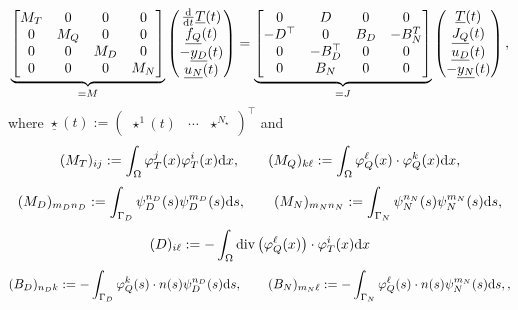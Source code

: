 \documentclass[letterpaper,10pt,english]{sphinxmanual}
\begin{document}
\begin{equation*}
\begin{split}\underbrace{\begin{bmatrix}
M_T & 0 & 0 & 0 \\
0 & M_Q & 0 & 0 \\
0 & 0 & M_D & 0 \\
0 & 0 & 0 & M_N
\end{bmatrix}}_{= M}
\begin{pmatrix}
\frac{\rm d}{{\rm d}t} \underline{T}(t) \\
\underline{f_Q}(t) \\
-\underline{y_D}(t) \\
\underline{u_N}(t)
\end{pmatrix}
=
\underbrace{\begin{bmatrix}
0 & D & 0 & 0 \\
-D^\top & 0 & B_D & -B_N^T \\
0 & -B_D^\top & 0 & 0 \\
0 & B_N & 0 & 0
\end{bmatrix}}_{= J}
\begin{pmatrix}
\underline{T}(t) \\
\underline{J_Q}(t) \\
\underline{u_D}(t) \\
-\underline{y_N}(t)
\end{pmatrix},\end{split}
\end{equation*}
\sphinxAtStartPar
where
\(\underline{\star}(t) := \begin{pmatrix} \star^1(t) & \cdots & \star^{N_\star} \end{pmatrix}^\top\)
and
\begin{equation*}
\begin{split}(M_T)_{ij} := \int_\Omega \varphi_T^j(x) \varphi_T^i(x) {\rm d}x,
\qquad
(M_Q)_{k\ell} := \int_\Omega \varphi_Q^\ell(x) \cdot \varphi_Q^k(x) {\rm d}x,\end{split}
\end{equation*}\begin{equation*}
\begin{split}(M_D)_{m_Dn_D} := \int_{\Gamma_D} \psi_D^{n_D}(s) \psi_D^{m_D}(s) {\rm d}s,
\qquad
(M_N)_{m_Nn_N} := \int_{\Gamma_N} \psi_N^{n_N}(s) \psi_N^{m_N}(s) {\rm d}s,\end{split}
\end{equation*}\begin{equation*}
\begin{split}(D)_{i\ell} := - \int_\Omega {\rm div} \left( \varphi_Q^\ell(x) \right) \cdot \varphi_T^i(x) {\rm d}x\end{split}
\end{equation*}\begin{equation*}
\begin{split}(B_D)_{n_Dk} := - \int_{\Gamma_D} \varphi_Q^k(s) \cdot n(s) \psi_D^{n_D}(s) {\rm d}s,
\qquad
(B_N)_{m_N\ell} := - \int_{\Gamma_N} \varphi_Q^\ell(s) \cdot n(s) \psi_N^{m_N}(s) {\rm d}s,,\end{split}
\end{equation*}
\end{document}
